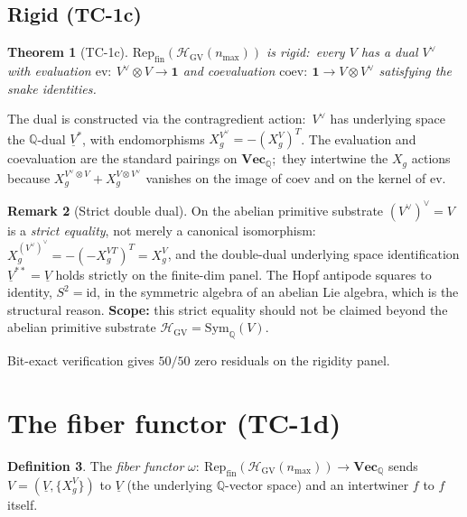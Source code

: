 \documentclass[11pt,a4paper]{article}
\theoremstyle{plain}
\newtheorem{theorem}{Theorem}[section]
\theoremstyle{definition}
\newtheorem{definition}[theorem]{Definition}
\newtheorem{remark}[theorem]{Remark}
\newcommand{\nmax}{n_{\max}}
\newcommand{\HGV}{\mathcal{H}_{\mathrm{GV}}}
\newcommand{\Repcat}{\mathrm{Rep}_{\mathrm{fin}}}
\newcommand{\Sym}{\mathrm{Sym}}
\newcommand{\Vecbf}{\mathbf{Vec}}
\newcommand{\Q}{\mathbb{Q}}
\newcommand{\fibfun}{\omega}
\begin{document}
\subsection{Rigid (TC-1c)}\label{sec:rigid}

\begin{theorem}[TC-1c]\label{thm:rigid}
$\Repcat(\HGV(\nmax))$ is rigid:\ every $V$ has a dual $V^{\vee}$ with
evaluation $\mathrm{ev} :\ V^{\vee} \otimes V \to \mathbf{1}$ and
coevaluation $\mathrm{coev} :\ \mathbf{1} \to V \otimes V^{\vee}$
satisfying the snake identities.
\end{theorem}

The dual is constructed via the contragredient action:\ $V^{\vee}$
has underlying space the $\Q$-dual $\underline{V}^{*}$, with
endomorphisms $X_{g}^{V^{\vee}} = -(X_{g}^{V})^{T}$. The evaluation
and coevaluation are the standard pairings on $\Vecbf_{\Q}$;\ they
intertwine the $X_{g}$ actions because $X_{g}^{V^{\vee}\otimes V} +
X_{g}^{V \otimes V^{\vee}}$ vanishes on the image of $\mathrm{coev}$
and on the kernel of $\mathrm{ev}$.

\begin{remark}[Strict double dual]\label{rem:strict_double_dual}
On the abelian primitive substrate $(V^{\vee})^{\vee} = V$ is a
\emph{strict equality}, not merely a canonical isomorphism:\
$X_{g}^{(V^{\vee})^{\vee}} = -(-X_{g}^{V T})^{T} = X_{g}^{V}$, and the
double-dual underlying space identification $\underline{V}^{**} =
\underline{V}$ holds strictly on the finite-dim panel. The Hopf
antipode squares to identity, $S^{2} = \mathrm{id}$, in the symmetric
algebra of an abelian Lie algebra, which is the structural reason.
\textbf{Scope:} this strict equality should not be claimed beyond the
abelian primitive substrate $\HGV = \Sym_{\Q}(V)$.
\end{remark}

Bit-exact verification gives $50 / 50$ zero residuals on the rigidity
panel.

\section{The fiber functor (TC-1d)}\label{sec:fiber_functor}

\begin{definition}\label{def:fiber_functor}
The \emph{fiber functor} $\fibfun :\ \Repcat(\HGV(\nmax)) \to \Vecbf_{\Q}$
sends $V = (\underline{V}, \{X_{g}^{V}\})$ to $\underline{V}$ (the
underlying $\Q$-vector space) and an intertwiner $f$ to $f$ itself.
\end{definition}
\end{document}
